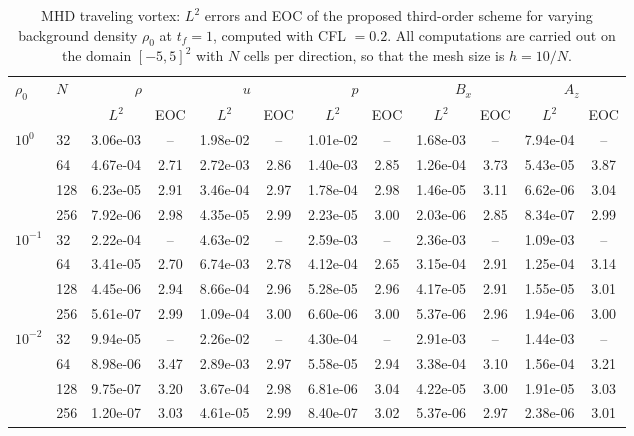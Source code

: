 \begin{table}[t]
\centering
\footnotesize
\setlength{\tabcolsep}{4pt}
\caption{MHD traveling vortex: $L^2$ errors and EOC of the proposed third-order
scheme for varying background density $\rho_0$ at $t_f=1$, computed with CFL $=0.2$.
All computations are carried out on the domain $[-5,5]^2$ with $N$ cells per
direction, so that the mesh size is $h=10/N$.}
\label{tab:vortex_eoc_o3}
\begin{tabular}{ll*{5}{rc}}
\toprule
$\rho_0$ & $N$ & \multicolumn{2}{c}{$\rho$} & \multicolumn{2}{c}{$u$} & \multicolumn{2}{c}{$p$} & \multicolumn{2}{c}{$B_x$} & \multicolumn{2}{c}{$A_z$} \\
 & & \multicolumn{1}{c}{$L^2$} & EOC & \multicolumn{1}{c}{$L^2$} & EOC & \multicolumn{1}{c}{$L^2$} & EOC & \multicolumn{1}{c}{$L^2$} & EOC & \multicolumn{1}{c}{$L^2$} & EOC \\
\midrule
$10^{0}$  & 32   & 3.06e-03 & --   & 1.98e-02 & --   & 1.01e-02 & --   & 1.68e-03 & --   & 7.94e-04 & --   \\
          & 64   & 4.67e-04 & 2.71 & 2.72e-03 & 2.86 & 1.40e-03 & 2.85 & 1.26e-04 & 3.73 & 5.43e-05 & 3.87 \\
          & 128  & 6.23e-05 & 2.91 & 3.46e-04 & 2.97 & 1.78e-04 & 2.98 & 1.46e-05 & 3.11 & 6.62e-06 & 3.04 \\
          & 256  & 7.92e-06 & 2.98 & 4.35e-05 & 2.99 & 2.23e-05 & 3.00 & 2.03e-06 & 2.85 & 8.34e-07 & 2.99 \\
$10^{-1}$ & 32   & 2.22e-04 & --   & 4.63e-02 & --   & 2.59e-03 & --   & 2.36e-03 & --   & 1.09e-03 & --   \\
          & 64   & 3.41e-05 & 2.70 & 6.74e-03 & 2.78 & 4.12e-04 & 2.65 & 3.15e-04 & 2.91 & 1.25e-04 & 3.14 \\
          & 128  & 4.45e-06 & 2.94 & 8.66e-04 & 2.96 & 5.28e-05 & 2.96 & 4.17e-05 & 2.91 & 1.55e-05 & 3.01 \\
          & 256  & 5.61e-07 & 2.99 & 1.09e-04 & 3.00 & 6.60e-06 & 3.00 & 5.37e-06 & 2.96 & 1.94e-06 & 3.00 \\
$10^{-2}$ & 32   & 9.94e-05 & --   & 2.26e-02 & --   & 4.30e-04 & --   & 2.91e-03 & --   & 1.44e-03 & --   \\
          & 64   & 8.98e-06 & 3.47 & 2.89e-03 & 2.97 & 5.58e-05 & 2.94 & 3.38e-04 & 3.10 & 1.56e-04 & 3.21 \\
          & 128  & 9.75e-07 & 3.20 & 3.67e-04 & 2.98 & 6.81e-06 & 3.04 & 4.22e-05 & 3.00 & 1.91e-05 & 3.03 \\
          & 256  & 1.20e-07 & 3.03 & 4.61e-05 & 2.99 & 8.40e-07 & 3.02 & 5.37e-06 & 2.97 & 2.38e-06 & 3.01 \\

\end{tabular}
\end{table}
